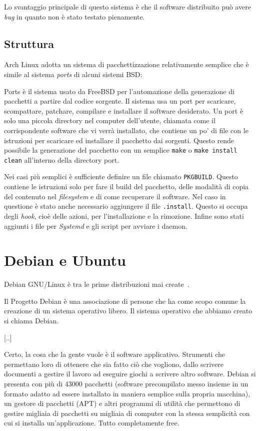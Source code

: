 \documentclass[10pt,titlepage,twoside,a4paper]{report}
\begin{document}
Lo svantaggio principale di questo sistema è che il software distribuito 
può avere \emph{bug} in quanto non è stato testato pienamente.

\subsection{Struttura}
Arch Linux adotta un sistema di pacchettizzazione relativamente semplice 
che è simile al sistema \emph{ports} di alcuni sistemi 
BSD\cite{portsLikeSystem}:
\begin{displayquote}
Ports è il sistema usato da FreeBSD per l'automazione della generazione di 
pacchetti a partire dal codice sorgente. Il sistema usa un port per scaricare, 
scompattare, patchare, compilare e installare il software desiderato. Un port 
è solo una piccola directory nel computer dell'utente, chiamata come il 
corrispondente software che vi verrà installato, che contiene un po' di file 
con le istruzioni per scaricare ed installare il pacchetto dai sorgenti. Questo 
rende possibile la generazione del pacchetto con un semplice \texttt{make} o 
\texttt{make install clean} all'interno della directory port.
\end{displayquote}

Nei casi più semplici è sufficiente definire un file chiamato 
\texttt{PKGBUILD}. Questo contiene le istruzioni solo per fare il build del 
pacchetto, delle modalità di copia del contenuto nel \emph{filesystem} e di 
come recuperare il software. Nel caso in questione è stato anche necessario 
aggiungere il file \texttt{.install}. Questo si occupa degli \emph{hook}, cioè 
delle azioni, per l'installazione e la rimozione. Infine sono stati aggiunti i 
file per \emph{Systemd} e gli script per avviare i daemon.


\section{Debian e Ubuntu}
Debian GNU/Linux è tra le prime distribuzioni mai 
create\cite{debianFirstDistro}~\cite{debian}.
\begin{displayquote}
Il Progetto Debian è una associazione di persone che ha come scopo comune la 
creazione di un sistema operativo libero. Il sistema operativo che abbiamo 
creato si chiama Debian.

[..]

Certo, la cosa che la gente vuole è il software applicativo. Strumenti che 
permettano loro di ottenere che sia fatto ciò che vogliono, dallo scrivere 
documenti a gestire il lavoro ad eseguire giochi a scrivere altro software. 
Debian si presenta con più di 43000 pacchetti (software precompilato messo 
insieme in un formato adatto ad essere installato in maniera semplice sulla 
propria macchina), un gestore di pacchetti (APT) e altri programmi di utilità 
che permettono di gestire migliaia di pacchetti su migliaia di computer con la 
stessa semplicità con cui si installa un'applicazione. Tutto completamente 
free. 
\end{displayquote}
\end{document}
